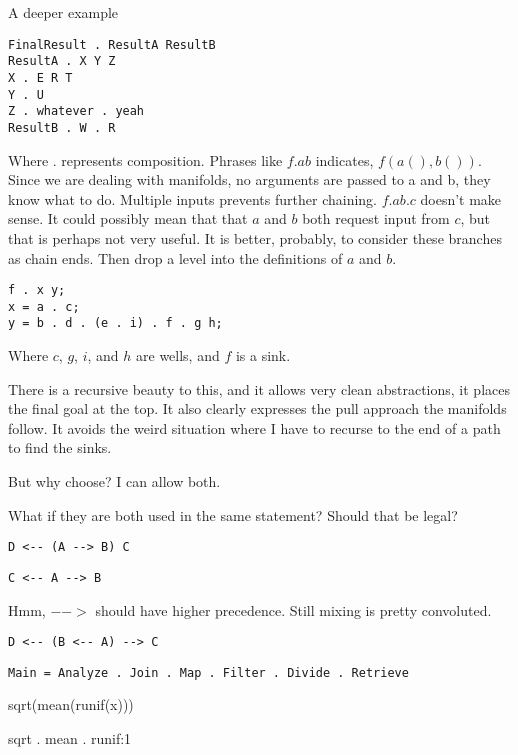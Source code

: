 \documentclass[12pt]{article}
\begin{document}
A deeper example

\begin{verbatim}
FinalResult . ResultA ResultB
ResultA . X Y Z
X . E R T
Y . U
Z . whatever . yeah
ResultB . W . R
\end{verbatim}

Where $.$ represents composition. Phrases like $f . a b$ indicates,
$f(a(),b())$. Since we are dealing with manifolds, no arguments are passed to
a and b, they know what to do. Multiple inputs prevents further chaining. $f . a b . c$ doesn't make sense. It could possibly mean that that $a$ and $b$
both request input from $c$, but that is perhaps not very useful. It is better,
probably, to consider these branches as chain ends. Then drop a level into the
definitions of $a$ and $b$.

\begin{verbatim}
f . x y;
x = a . c;
y = b . d . (e . i) . f . g h;
\end{verbatim}

Where $c$, $g$, $i$, and $h$ are wells, and $f$ is a sink.

There is a recursive beauty to this, and it allows very clean abstractions, it
places the final goal at the top. It also clearly expresses the pull approach
the manifolds follow. It avoids the weird situation where I have to recurse to
the end of a path to find the sinks.

But why choose? I can allow both.

What if they are both used in the same statement? Should that be legal?

\begin{verbatim}
D <-- (A --> B) C 
\end{verbatim}

\begin{verbatim}
C <-- A --> B
\end{verbatim}

Hmm, $-->$ should have higher precedence. Still mixing is pretty convoluted.

\begin{verbatim}
D <-- (B <-- A) --> C
\end{verbatim}


\begin{verbatim}
Main = Analyze . Join . Map . Filter . Divide . Retrieve
\end{verbatim}


sqrt(mean(runif(x)))

sqrt . mean . runif:1
\end{document}
